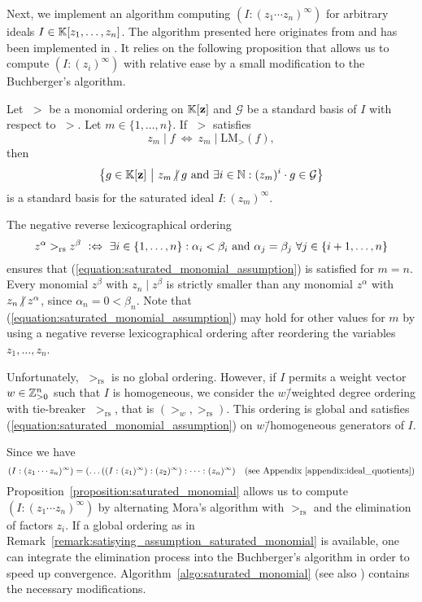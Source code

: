 Next, we implement an algorithm computing $(I : (z_1\cdots z_n)^\infty)$ for arbitrary ideals $I\in\mathbb{K}[z_1,\dots,z_n]$. The algorithm presented here originates from \cite{gitfan_symmetry} and has been implemented in \gitfanlib. It relies on the following proposition that allows us to compute $(I : (z_i)^\infty)$ with relative ease by a small modification to the Buchberger's algorithm.

\begin{prop}
	\label{proposition:saturated_monomial}
	Let $\;>$ be a monomial ordering on $\mathbb{K}[\mathbf{z}]$ and $\mathcal{G}$ be a standard basis of $I$ with respect to $\;>$. Let $m\in\{1,\dots,n\}$. If $\;>$ satisfies
	\begin{equation}
		\label{equation:saturated_monomial_assumption}
		z_m \mid f\ \Leftrightarrow\ z_m \mid \text{LM}_>(f),
	\end{equation}
	then
	$$\left\{g\in\field[\mathbf{z}]\ \middle|\ z_m \centernot\mid g\ \mathrm{and}\ \exists i\in\natural: (z_m)^i \cdot g \in \mathcal{G}\right\}$$
	is a standard basis for the saturated ideal $I : (z_m)^\infty$. 
\end{prop}

\begin{remark}
	\label{remark:satisying_assumption_saturated_monomial}
	The negative reverse lexicographical ordering
	$$z^\alpha >_\text{rs} z^\beta\ \defequiv\ \exists i\in\{1,\dots,n\}: \alpha_i < \beta_i\ \text{and}\ \alpha_j = \beta_j\ \forall j\in\{i+1,\dots,n\}$$
	ensures that (\ref{equation:saturated_monomial_assumption}) is satisfied for $m=n$. Every monomial $z^\beta$ with $z_n \mid z^\beta$ is strictly smaller than any monomial $z^\alpha$ with $z_n \centernot\mid z^\alpha$, since $\alpha_n = 0 < \beta_n$. Note that (\ref{equation:saturated_monomial_assumption}) may hold for other values for $m$ by using a negative reverse lexicographical ordering after reordering the variables $z_1,\dots,z_n$.
	
	Unfortunately, $\;>_\text{rs}$ is no global ordering. However, if $I$ permits a weight vector $w\in\mathbb{Z}^n_{>0}$ such that $I$ is homogeneous, we consider the $w$\=/weighted degree ordering with tie-breaker $\;>_\text{rs}$, that is $(>_w, >_\text{rs})$. This ordering is global and satisfies (\ref{equation:saturated_monomial_assumption}) on $w$\=/homogeneous generators of $I$.
\end{remark}

Since we have
$$(I:(z_1\cdots z_n)^\infty) = (\dots((I:(z_1)^\infty):(z_2)^\infty):\dots : (z_n)^\infty)\quad\text{(see Appendix \ref{appendix:ideal_quotients})}$$
Proposition~\ref{proposition:saturated_monomial} allows us to compute $(I : (z_1\cdots z_n)^\infty)$ by alternating Mora's algorithm with $>_\text{rs}$ and the elimination of factors $z_i$. If a global ordering as in Remark~\ref{remark:satisying_assumption_saturated_monomial} is available, one can integrate the elimination process into the Buchberger's algorithm in order to speed up convergence. Algorithm~\ref{algo:saturated_monomial} (see also \cite[Algorithm 3.3]{gitfan_symmetry}) contains the necessary modifications.

